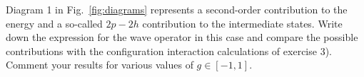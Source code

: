 Diagram 1 in Fig.~\ref{fig:diagrams} represents a second-order contribution to the energy and a so-called $2p-2h$ contribution to the intermediate states.
Write down the expression for the wave operator in this case and compare the possible contributions with the configuration interaction calculations of exercise 3). %
Comment your results for various values of $g\in [-1,1]$.
